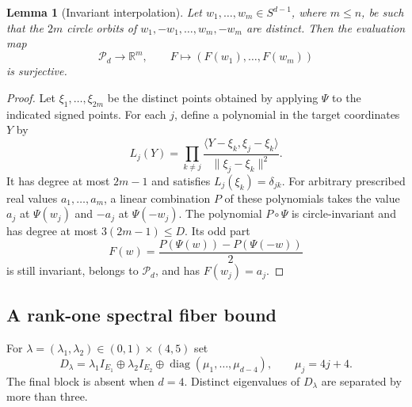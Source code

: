 \documentclass[11pt,reqno]{amsart}
\newtheorem{lemma}[lemma]{Lemma}
\theoremstyle{definition}
\theoremstyle{remark}
\numberwithin{equation}{section}
\newcommand{\R}{\mathbb R}
\newcommand{\Pol}{\mathcal P_d}
\newcommand{\ip}[2]{\langle #1,#2\rangle}
\newcommand{\norm}[1]{\lVert #1\rVert}
\DeclareMathOperator{\diag}{diag}
\begin{document}
\begin{lemma}[Invariant interpolation]\label{lem:interpolation}
Let $w_1,\ldots,w_m\in S^{d-1}$, where $m\leq n$, be such that
the $2m$ circle orbits of $w_1,-w_1,\ldots,w_m,-w_m$ are distinct.
Then the evaluation map
\[
 \Pol\longrightarrow\R^m,\qquad
 F\longmapsto(F(w_1),\ldots,F(w_m))
\]
is surjective.
\end{lemma}
\begin{proof}
Let $\xi_1,\ldots,\xi_{2m}$ be the distinct points obtained by applying
$\Psi$ to the indicated signed points. For each $j$, define a polynomial
in the target coordinates $Y$ by
\[
 L_j(Y)=\prod_{k\ne j}
  \frac{\ip{Y-\xi_k}{\xi_j-\xi_k}}{\norm{\xi_j-\xi_k}^2}.
\]
It has degree at most $2m-1$ and satisfies $L_j(\xi_k)=\delta_{jk}$.
For arbitrary prescribed real values $a_1,\ldots,a_m$, a linear
combination $P$ of these polynomials takes the value $a_j$ at
$\Psi(w_j)$ and $-a_j$ at $\Psi(-w_j)$.
The polynomial $P\circ\Psi$ is circle-invariant and has degree
at most $3(2m-1)\leq D$. Its odd part
\[
 F(w)=\frac{P(\Psi(w))-P(\Psi(-w))}{2}
\]
is still invariant, belongs to $\Pol$, and has $F(w_j)=a_j$.
\end{proof}

\subsection{A rank-one spectral fiber bound}
For $\lambda=(\lambda_1,\lambda_2)\in(0,1)\times(4,5)$ set
\begin{equation}\label{eq:Dlambda}
 D_\lambda=\lambda_1I_{E_1}\oplus\lambda_2I_{E_2}
       \oplus\diag(\mu_1,\ldots,\mu_{d-4}),
 \qquad \mu_j=4j+4.
\end{equation}
The final block is absent when $d=4$. Distinct eigenvalues of
$D_\lambda$ are separated by more than three.
\end{document}
